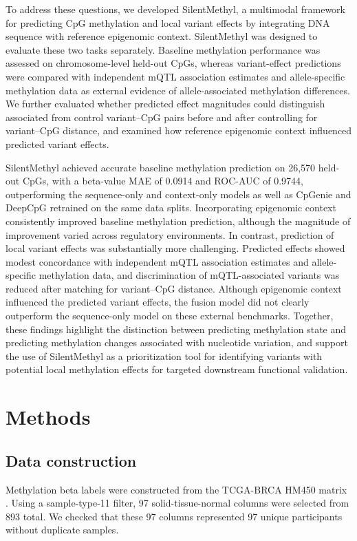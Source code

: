 \documentclass[11pt,letterpaper]{article}
\begin{document}
To address these questions, we developed SilentMethyl, a multimodal framework for predicting CpG methylation and local variant effects by integrating DNA sequence with reference epigenomic context. SilentMethyl was designed to evaluate these two tasks separately. Baseline methylation performance was assessed on chromosome-level held-out CpGs, whereas variant-effect predictions were compared with independent mQTL association estimates and allele-specific methylation data as external evidence of allele-associated methylation differences. We further evaluated whether predicted effect magnitudes could distinguish associated from control variant--CpG pairs before and after controlling for variant--CpG distance, and examined how reference epigenomic context influenced predicted variant effects.

SilentMethyl achieved accurate baseline methylation prediction on 26,570 held-out CpGs, with a beta-value MAE of 0.0914 and ROC-AUC of 0.9744, outperforming the sequence-only and context-only models as well as CpGenie and DeepCpG retrained on the same data splits. Incorporating epigenomic context consistently improved baseline methylation prediction, although the magnitude of improvement varied across regulatory environments. In contrast, prediction of local variant effects was substantially more challenging. Predicted effects showed modest concordance with independent mQTL association estimates and allele-specific methylation data, and discrimination of mQTL-associated variants was reduced after matching for variant--CpG distance. Although epigenomic context influenced the predicted variant effects, the fusion model did not clearly outperform the sequence-only model on these external benchmarks. Together, these findings highlight the distinction between predicting methylation state and predicting methylation changes associated with nucleotide variation, and support the use of SilentMethyl as a prioritization tool for identifying variants with potential local methylation effects for targeted downstream functional validation.

\section{Methods}
\subsection{Data construction}
Methylation beta labels were constructed from the TCGA-BRCA HM450 matrix \cite{tcga2012breast,grossman2016gdc}. Using a sample-type-11 filter, 97 solid-tissue-normal columns were selected from 893 total. We checked that these 97 columns represented 97 unique participants without duplicate samples.
\end{document}
